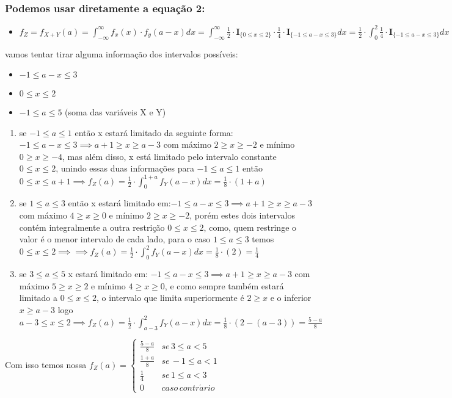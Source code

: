 \documentclass[portuguese]{article}
\begin{document}
\subsubsection*{\textmd{Podemos usar diretamente a equação 2:}}
\begin{itemize}
\item $f_{Z}=f_{X+Y}(a)=\int_{-\infty}^{\infty}f_{x}(x)\cdot f_{y}(a-x)dx=\int_{-\infty}^{\infty}\frac{1}{2}\cdot\mathbf{I}_{\{0\leq x\leq2\}}\cdot\frac{1}{4}\cdot\mathbf{I}_{\{-1\leq a-x\leq3\}}dx=\frac{1}{2}\cdot\int_{0}^{2}\frac{1}{4}\cdot\mathbf{I}_{\{-1\leq a-x\leq3\}}dx$
\end{itemize}
vamos tentar tirar alguma informação dos intervalos possíveis:
\begin{itemize}
\item $-1\leq a-x\leq3$
\item $0\leq x\leq2$
\item $-1\leq a\leq5$ (soma das variáveis X e Y)\end{itemize}
\begin{enumerate}
\item se $-1\leq a\leq1$ então x estará limitado da seguinte forma: $-1\leq a-x\leq3\implies a+1\geq x\geq a-3$
com máximo $2\geq x\geq-2$ e mínimo $0\geq x\geq-4$, mas além disso,
x está limitado pelo intervalo constante $0\leq x\leq2$, unindo essas
duas informações para $-1\leq a\leq1$ então $0\leq x\leq a+1\implies f_{Z}(a)=\frac{1}{2}\cdot\int_{0}^{1+a}f_{Y}(a-x)dx=\frac{1}{8}\cdot(1+a)$
\item se $1\leq a\leq3$ então x estará limitado em:$-1\leq a-x\leq3\implies a+1\geq x\geq a-3$
com máximo $4\geq x\geq0$ e mínimo $2\geq x\geq-2$, porém estes
dois intervalos contém integralmente a outra restrição $0\leq x\leq2$,
como, quem restringe o valor é o menor intervalo de cada lado, para
o caso $1\leq a\leq3$ temos $0\leq x\leq2\implies\implies f_{Z}(a)=\frac{1}{2}\cdot\int_{0}^{2}f_{Y}(a-x)dx=\frac{1}{8}\cdot(2)=\frac{1}{4}$
\item se $3\leq a\leq5$ x estará limitado em: $-1\leq a-x\leq3\implies a+1\geq x\geq a-3$
com máximo $5\geq x\geq2$ e mínimo $4\geq x\geq0$, e como sempre
também estará limitado a $0\leq x\leq2$, o intervalo que limita superiormente
é $2\geq x$ e o inferior $x\geq a-3$ logo $a-3\leq x\leq2\implies f_{Z}(a)=\frac{1}{2}\cdot\int_{a-3}^{2}f_{Y}(a-x)dx=\frac{1}{8}\cdot(2-(a-3))=\frac{5-a}{8}$
\end{enumerate}
Com isso temos nossa $f_{Z}(a)=\begin{cases}
\frac{5-a}{8} & se\,3\leq a<5\\
\frac{1+a}{8} & se\,-1\leq a<1\\
\frac{1}{4} & se\,1\leq a<3\\
0 & caso\, contr\acute{a}rio
\end{cases}$
\end{document}
